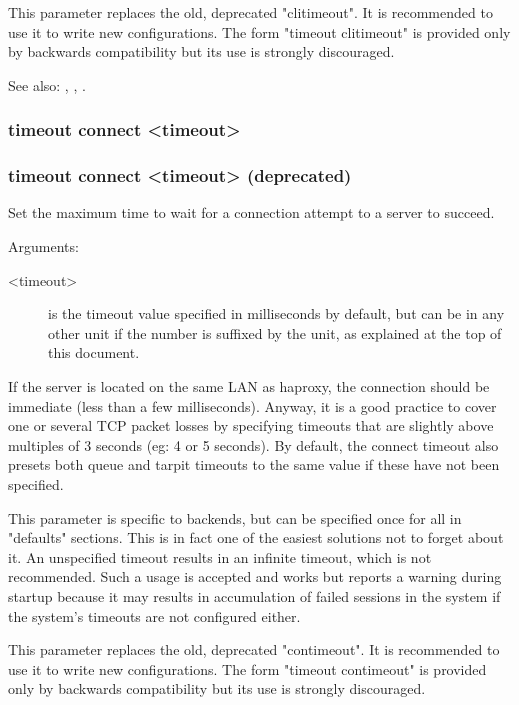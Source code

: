   This parameter replaces the old, deprecated "clitimeout". It is recommended
  to use it to write new configurations. The form "timeout clitimeout" is
  provided only by backwards compatibility but its use is strongly discouraged.

  See also: , , .

\subsubsection[timeout connect]{timeout connect <timeout>}
\subsubsection[timeout contimeout]{timeout connect <timeout> (deprecated)}


  Set the maximum time to wait for a connection attempt to a server to succeed.


  Arguments:
  \begin{description}
  \item[<timeout>] is the timeout value specified in milliseconds by default, but
              can be in any other unit if the number is suffixed by the unit,
              as explained at the top of this document.
  \end{description}

  If the server is located on the same LAN as haproxy, the connection should be
  immediate (less than a few milliseconds). Anyway, it is a good practice to
  cover one or several TCP packet losses by specifying timeouts that are
  slightly above multiples of 3 seconds (eg: 4 or 5 seconds). By default, the
  connect timeout also presets both queue and tarpit timeouts to the same value
  if these have not been specified.

  This parameter is specific to backends, but can be specified once for all in
  "defaults" sections. This is in fact one of the easiest solutions not to
  forget about it. An unspecified timeout results in an infinite timeout, which
  is not recommended. Such a usage is accepted and works but reports a warning
  during startup because it may results in accumulation of failed sessions in
  the system if the system's timeouts are not configured either.

  This parameter replaces the old, deprecated "contimeout". It is recommended
  to use it to write new configurations. The form "timeout contimeout" is
  provided only by backwards compatibility but its use is strongly discouraged.

